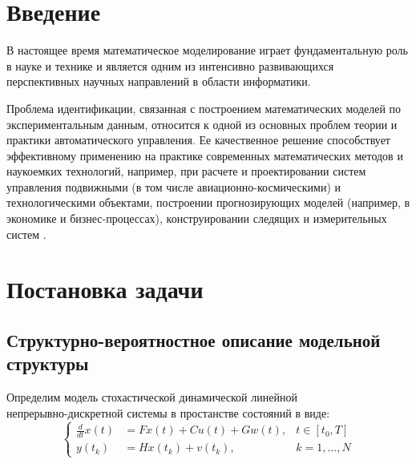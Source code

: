 \documentclass[a4paper,14pt]{extarticle}
\begin{document}
\tableofcontents

\newpage

\section*{Введение}

В настоящее время математическое моделирование играет фундаментальную роль в
науке и технике и является одним из интенсивно развивающихся перспективных
научных направлений в области информатики.

Проблема идентификации, связанная с построением математических моделей по
экспериментальным данным, относится к одной из основных проблем теории и
практики автоматического управления. Ее качественное решение способствует
эффективному применению на практике современных математических методов и
наукоемких технологий, например, при расчете и проектировании систем управления
подвижными (в том числе авиационно-космическими) и технологическими объектами,
построении прогнозирующих моделей (например, в экономике и бизнес-процессах),
конструировании следящих и измерительных систем \cite{denisov}.

\section{Постановка задачи}

\subsection[Структурно-вероятностное описание модельной структуры]
{Структурно-вероятностное описание модельной \\структуры}


Определим модель стохастической динамической линейной \\непрерывно-дискретной
системы в простанстве состояний в виде:
\begin{equation}
	\label{eq:initmod}
	\left\{ 
		\begin{array}{lll}
			\frac{d}{dt}x(t) &= F x(t) + C u(t) + G w(t), & t \in [t_0,T] \\ 
			y(t_k)           &= H x(t_k) + v(t_k),        & k = 1,\ldots, N
		\end{array} 
	\right. 
\end{equation}
\end{document}
